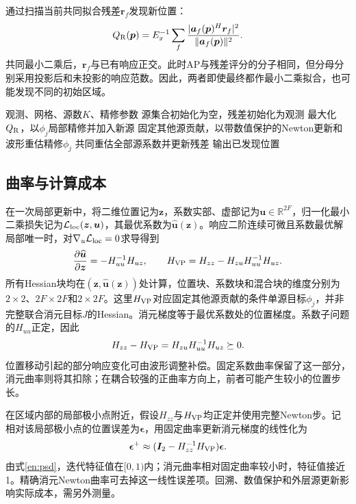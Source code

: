 \documentclass[a4paper,fleqn]{cas-sc}
\newcommand{\R}{\mathbb R}
\begin{document}
通过扫描当前共同拟合残差$\bm r_f$发现新位置：
\begin{equation}
Q_{\rm R}(\bm p)=E_x^{-1}\sum_f
 \frac{|\bm a_f(\bm p)^H\bm r_f|^2}{\|\bm a_f(\bm p)\|^2}.
\end{equation}
共同最小二乘后，$\bm r_f$与已有响应正交。此时AP与残差评分的分子相同，但分母分别采用投影后和未投影的响应范数。因此，两者即使最终都作最小二乘拟合，也可能发现不同的初始区域。

\begin{algorithm}[H]
\caption{VP-BNOMP}\label{en:algnomp}
\begin{algorithmic}[1]
\Require 观测、网格、源数$K$、精修参数
\State 源集合初始化为空，残差初始化为观测
\State 最大化$Q_{\rm R}$，以$\phi_j$局部精修并加入新源
\Repeat
{}
\State 固定其他源贡献，以带数值保护的Newton更新和波形重估精修$\phi_j$
\EndFor
{}
\State 共同重估全部源系数并更新残差
\EndFor
\State 输出已发现位置
\end{algorithmic}
\end{algorithm}

\FloatBarrier
\subsection{曲率与计算成本}
在一次局部更新中，将二维位置记为$\bm z$，系数实部、虚部记为$\bm u\in\R^{2F}$，归一化最小二乘损失记为$\mathcal L_{\rm loc}(\bm z,\bm u)$，其最优系数为$\widehat{\bm u}(\bm z)$。响应二阶连续可微且系数最优解局部唯一时，对$\nabla_u\mathcal L_{\rm loc}=0$求导得到
\begin{equation}
\frac{\partial\widehat{\bm u}}{\partial\bm z}=-H_{uu}^{-1}H_{uz},\qquad
H_{\rm VP}=H_{zz}-H_{zu}H_{uu}^{-1}H_{uz}.
\label{en:schur}
\end{equation}
所有Hessian块均在$(\bm z,\widehat{\bm u}(\bm z))$处计算，位置块、系数块和混合块的维度分别为$2\times2$、$2F\times2F$和$2\times2F$。这里$H_{\rm VP}$对应固定其他源贡献的条件单源目标$\phi_j$，并非完整联合消元目标$J$的Hessian。消元梯度等于最优系数处的位置梯度\cite{GolubPereyra1973}。系数子问题的$H_{uu}$正定，因此
\begin{equation}
H_{zz}-H_{\rm VP}=H_{zu}H_{uu}^{-1}H_{uz}\succeq0.
\label{en:psd}
\end{equation}
位置移动引起的部分响应变化可由波形调整补偿。固定系数曲率保留了这一部分，消元曲率则将其扣除；在耦合较强的正曲率方向上，前者可能产生较小的位置步长。

在区域内部的局部极小点附近，假设$H_{zz}$与$H_{\rm VP}$均正定并使用完整Newton步。记相对该局部极小点的位置误差为$\bm\epsilon$，用固定曲率更新消元梯度的线性化为
\begin{equation}
\bm\epsilon^+\approx(\bm I_2-H_{zz}^{-1}H_{\rm VP})\bm\epsilon.
\label{en:rate}
\end{equation}
由式\eqref{en:psd}，迭代特征值在$[0,1)$内；消元曲率相对固定曲率较小时，特征值接近1。精确消元Newton曲率可去掉这一线性误差项。回溯、数值保护和外层源更新影响实际成本，需另外测量。
\end{document}
